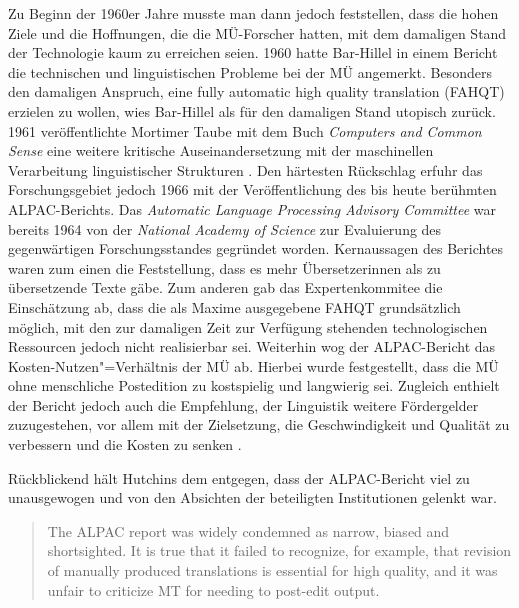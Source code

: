 Zu Beginn der 1960er Jahre musste man dann jedoch feststellen, dass die hohen Ziele und die Hoffnungen, die die MÜ-Forscher hatten, mit dem damaligen Stand der Technologie kaum zu erreichen seien. 1960 hatte Bar-Hillel in einem Bericht die technischen und linguistischen Probleme bei der MÜ angemerkt. Besonders den damaligen Anspruch, eine \glqq fully automatic high quality translation (FAHQT)\grqq{} \citep[438]{hutchins_machine_1995} erzielen zu wollen, wies Bar-Hillel als für den damaligen Stand utopisch zurück. 1961 veröffentlichte Mortimer Taube mit dem Buch \emph{Computers and Common Sense} eine weitere kritische Auseinandersetzung mit der maschinellen Verarbeitung linguistischer Strukturen \citep[9]{henisz-dostert_machine_1979}. Den härtesten Rückschlag erfuhr das Forschungsgebiet jedoch 1966 mit der Veröffentlichung des bis heute berühmten ALPAC-Berichts. Das \emph{Automatic Language Processing Advisory Committee} war bereits 1964 von der \emph{National Academy of Science} zur Evaluierung des gegenwärtigen Forschungsstandes gegründet worden. Kernaussagen des Berichtes waren zum einen die Feststellung, dass es mehr Übersetzer{\textperiodcentered}innen als zu übersetzende Texte gäbe. Zum anderen gab das Expertenkommitee die Einschätzung ab, dass die als Maxime ausgegebene FAHQT grundsätzlich möglich, mit den zur damaligen Zeit zur Verfügung stehenden technologischen Ressourcen jedoch nicht realisierbar sei. Weiterhin wog der ALPAC-Bericht das Kosten-Nutzen"=Verhältnis der MÜ ab. Hierbei wurde festgestellt, dass die MÜ ohne menschliche Postedition zu kostspielig und langwierig sei. Zugleich enthielt der Bericht jedoch auch die Empfehlung, der Linguistik weitere Fördergelder zuzugestehen, vor allem mit der Zielsetzung, die Geschwindigkeit und Qualität zu verbessern und die Kosten zu senken \citep[1--34]{automatic_language_processing_advisory_committee_language_1966}.

Rückblickend hält Hutchins dem entgegen, dass der ALPAC-Bericht viel zu unausgewogen und von den Absichten der beteiligten Institutionen gelenkt war.


\begin{quote}

The ALPAC report was widely condemned as narrow, biased and shortsighted. It is true that it failed to recognize, for example, that revision of manually produced translations is essential for high quality, and it was unfair to criticize MT for needing to post-edit output. \citep[439]{hutchins_machine_1995}

\end{quote}


